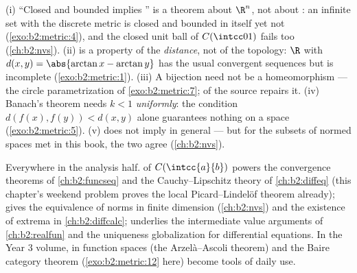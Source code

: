 \begin{remark}\label{rem:b2:metric:pitfalls}
(i) ``Closed and bounded implies '' is a theorem about
$\R^n$, not about : an infinite set with the
discrete metric is closed and bounded in itself yet not 
(\cref{exo:b2:metric:4}), and the closed unit ball of
$C(\intcc01)$ fails too (\cref{ch:b2:nvs}). (ii)  is
a property of the \emph{distance}, not of the topology: $\R$
with $d(x,y) = \abs{\arctan x - \arctan y}$ has the usual
convergent sequences but is incomplete
(\cref{exo:b2:metric:1}). (iii) A  bijection need not
be a homeomorphism --- the circle parametrization of
\cref{exo:b2:metric:7};  of the source repairs it.
(iv) Banach's theorem needs $k < 1$ \emph{uniformly}: the
condition $d(f(x), f(y)) < d(x,y)$ alone guarantees nothing on a
 space (\cref{exo:b2:metric:5}). (v)  does
not imply  in general --- but for the 
subsets of normed spaces met in this book, the two agree
(\cref{ch:b2:nvs}).
\end{remark}

\begin{remark}
Everywhere in the analysis half.  of
$C(\intcc{a}{b})$ powers the convergence theorems of
\cref{ch:b2:funcseq} and the Cauchy--Lipschitz theory of
\cref{ch:b2:diffeq} (this chapter's weekend problem proves the
local Picard--Lindel\"of theorem already);  gives the
equivalence of norms in finite dimension (\cref{ch:b2:nvs}) and
the existence of extrema in \cref{ch:b2:diffcalc}; 
underlies the intermediate value arguments of \cref{ch:b2:realfun}
and the uniqueness globalization for differential equations. In
the Year 3 volume,  in function spaces (the
Arzel\`a--Ascoli theorem) and the Baire category theorem
(\cref{exo:b2:metric:12} here) become tools of daily use.
\end{remark}

